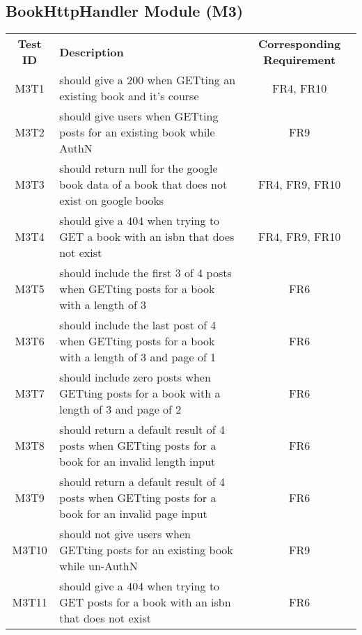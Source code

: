 \documentclass[fullpage]{article}
\begin{document}
\begin{table}[H]
\begin{tabular}{|c|p{8.5cm}|p{5cm}|}
\end{tabular}
\end{table}

\subsection{BookHttpHandler Module (M3)}
\begin{table}[H]
\flushleft
\begin{tabular}{|c|p{8.5cm}|c|}
\hline
 \rowcolor{lightgray}
\textbf{Test ID} &\textbf{Description} &\textbf{Corresponding Requirement}\\
M3T1 & should give a 200 when GETting an existing book and it's course & FR4, FR10 \\
\hline
M3T2 & should give users when GETting posts for an existing book while AuthN & FR9 \\
\hline
M3T3 & should return null for the google book data of a book that does not exist on google books & FR4, FR9, FR10 \\
\hline
M3T4 & should give a 404 when trying to GET a book with an isbn that does not exist & FR4, FR9, FR10 \\
\hline
M3T5 & should include the first 3 of 4 posts when GETting posts for a book with a length of 3 & FR6 \\
\hline
M3T6 & should include the last post of 4 when GETting posts for a book with a length of 3 and page of 1 & FR6 \\
\hline
M3T7 & should include zero posts when GETting posts for a book with a length of 3 and page of 2 & FR6 \\
\hline
M3T8 & should return a default result of 4 posts when GETting posts for a book for an invalid length input & FR6 \\
\hline
M3T9 & should return a default result of 4 posts when GETting posts for a book for an invalid page input & FR6 \\
\hline
M3T10 & should not give users when GETting posts for an existing book while un-AuthN & FR9 \\
\hline
M3T11 & should give a 404 when trying to GET posts for a book with an isbn that does not exist & FR6 \\
\hline
\end{tabular}
\end{table}
\end{document}
